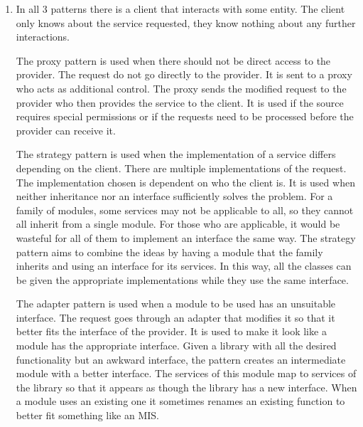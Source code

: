 \documentclass[12pt]{article}
\begin{document}
\begin{enumerate}
	\item In all 3 patterns there is a client that interacts with some entity. The client only knows about the service requested, they know nothing about any further interactions.
	
	The proxy pattern is used when there should not be direct access to the provider. The request do not go directly to the provider. It is sent to a proxy who acts as additional control. The proxy sends the modified request to the provider who then provides the service to the client. It is used if the source requires special permissions or if the requests need to be processed before the provider can receive it.
	
	The strategy pattern is used when the implementation of a service differs depending on the client. There are multiple implementations of the request. The implementation chosen is dependent on who the client is. It is used when neither inheritance nor an interface sufficiently solves the problem. For a family of modules, some services may not be applicable to all, so they cannot all inherit from a single module. For those who are applicable, it would be wasteful for all of them to implement an interface the same way. The strategy pattern aims to combine the ideas by having a module that the family inherits and using an interface for its services. In this way, all the classes can be given the appropriate implementations while they use the same interface.
	
	The adapter pattern is used when a module to be used has an unsuitable interface. The request goes through an adapter that modifies it so that it better fits the interface of the provider. It is used to make it look like a module has the appropriate interface. Given a library with all the desired functionality but an awkward interface, the pattern creates an intermediate module with a better interface. The services of this module map to services of the library so that it appears as though the library has a new interface. When a module uses an existing one it sometimes renames an existing function to better fit something like an MIS.  
	

\end{enumerate}
\end{document}
